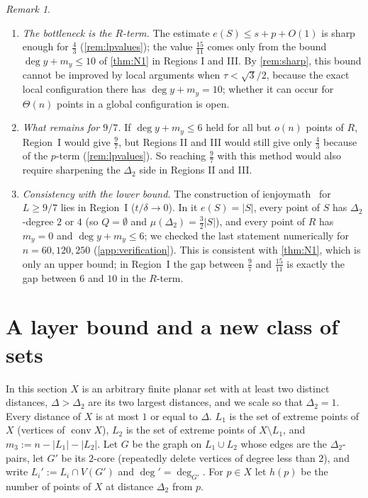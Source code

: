 \documentclass[11pt]{amsart}
\theoremstyle{definition}
\theoremstyle{remark}
\newtheorem{remark}[theorem]{Remark}
\newcommand{\Dt}{\Delta_2}
\newcommand{\mult}{\mu}
\newcommand{\conv}{\operatorname{conv}}
\begin{document}
\begin{remark}\label{rem:bottleneck}
\begin{enumerate}[leftmargin=2em,label=(\alph*)]
\item \emph{The bottleneck is the $R$-term.} The estimate $e(S)\le s+p+O(1)$ is sharp enough for $\frac43$ (\cref{rem:lpvalues}); the value $\frac{15}{11}$ comes only from the bound $\deg y+m_y\le10$ of \cref{thm:N1} in Regions I and III. By \cref{rem:sharp}, this bound cannot be improved by local arguments when $\tau<\sqrt3/2$, because the exact local configuration there has $\deg y+m_y=10$; whether it can occur for $\Theta(n)$ points in a global configuration is open.
\item \emph{What remains for $9/7$.} If $\deg y+m_y\le 6$ held for all but $o(n)$ points of $R$, Region~I would give $\frac97$, but Regions II and III would still give only $\frac43$ because of the $p$-term (\cref{rem:lpvalues}). So reaching $\frac97$ with this method would also require sharpening the $\Dt$ side in Regions II and III.
\item \emph{Consistency with the lower bound.} The construction of ienjoymath~\cite{ienjoymath} for $L\ge9/7$ lies in Region~I ($t/\delta\to0$). In it $e(S)=|S|$, every point of $S$ has $\Dt$-degree $2$ or $4$ (so $Q=\emptyset$ and $\mult(\Dt)=\frac32|S|$), and every point of $R$ has $m_y=0$ and $\deg y+m_y\le6$; we checked the last statement numerically for $n=60,120,250$ (\cref{app:verification}). This is consistent with \cref{thm:N1}, which is only an upper bound; in Region~I the gap between $\frac97$ and $\frac{15}{11}$ is exactly the gap between $6$ and $10$ in the $R$-term.
\end{enumerate}
\end{remark}
\section{A layer bound and a new class of sets}\label{sec:layers}

In this section $X$ is an arbitrary finite planar set with at least two distinct distances, $\Delta>\Dt$ are its two largest distances, and we scale so that $\Dt=1$. Every distance of $X$ is at most $1$ or equal to $\Delta$. $L_1$ is the set of extreme points of $X$ (vertices of $\conv X$), $L_2$ is the set of extreme points of $X\setminus L_1$, and $m_3:=n-|L_1|-|L_2|$. Let $G$ be the graph on $L_1\cup L_2$ whose edges are the $\Dt$-pairs, let $G'$ be its $2$-core (repeatedly delete vertices of degree less than $2$), and write $L_i':=L_i\cap V(G')$ and $\deg'=\deg_{G'}$. For $p\in X$ let $h(p)$ be the number of points of $X$ at distance $\Dt$ from $p$.
\end{document}
